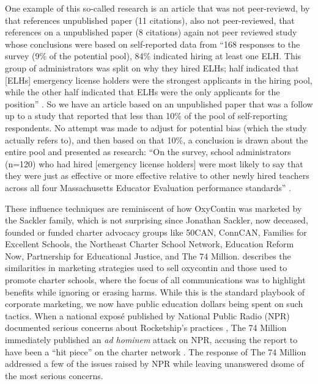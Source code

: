 One example of this so-called research is an article that was not peer-reviewd,  by \citeauthor{Piper-Vallillo2023} that references unpublished paper \textcite{Bacher-Hicks.etal2023} (11 citations), also not peer-reviewed, that references  on a unpublished paper \textcite{Bacher-Hicks.etal2023a} (8 citations) again not peer reviewed study whose conclusions were based on self-reported data from ``168 responses to the survey (9\% of the potential pool), 84\% indicated hiring at least one ELH. This group of administrators was split on why they hired ELHs; half indicated that [ELHs] emergency license holders were the strongest applicants in the hiring pool, while the other half indicated that ELHs were the only applicants for the position'' \parencite[3]{Bacher-Hicks.etal2023}. So we have an article based on an unpublished paper that was a follow up to a study that reported that less than 10\% of the pool of self-reporting respondents. No attempt was made to adjust for potential bias (which the study actually refers to), and then based on that 10\%, a conclusion is drawn about the entire pool and presented as research: ``On the survey, school administrators (n=120) who had hired [emergency license holders] were most likely to say that they were just as effective or more effective relative to other newly hired teachers across all four Massachusetts Educator Evaluation performance standards'' \parencite[3]{Bacher-Hicks.etal2023}.

These influence techniques are reminiscent of how OxyContin was marketed by the Sackler family, which is not surprising since Jonathan Sackler, now deceased, founded or funded charter advocacy groups like 50CAN, ConnCAN, Families for Excellent Schools, the Northeast Charter School Network, Education Reform Now, Partnership for Educational Justice, and The 74 Million. \textcite{Dubb2017} describes the similarities in marketing strategies used to sell oxycontin and those used to promote charter schools, where the focus of all communications was to highlight benefits while ignoring or erasing harms. While this is the standard playbook of corporate marketing, we now have public education dollars being spent on such tactics. When a national exposé published by National Public Radio (NPR) documented serious concerns about Rocketship's practices \parencite{Kamenetz2016}, The 74 Million immediately published an \textit{ad hominem} attack on NPR, accusing the report to have been a ``hit piece'' on the charter network \parencite{Smith2016a}. The response of The 74 Million addressed a few of the issues raised by NPR 
while leaving unanswered dsome of the most serious concerns.

